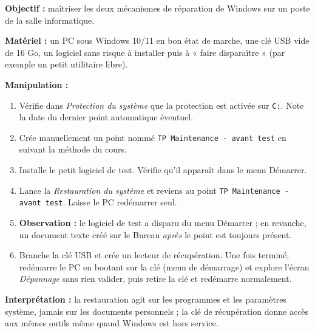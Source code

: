 \documentclass[11pt]{article}
\begin{document}
\begin{experience}
\textbf{Objectif :} maîtriser les deux mécanismes de réparation de Windows sur un poste de la salle informatique.\par
\textbf{Matériel :} un PC sous Windows 10/11 en bon état de marche, une clé USB vide de 16 Go, un logiciel sans risque à installer puis à « faire disparaître » (par exemple un petit utilitaire libre).\par
\textbf{Manipulation :}
\begin{enumerate}
\item Vérifie dans \emph{Protection du système} que la protection est activée sur \texttt{C:}. Note la date du dernier point automatique éventuel.
\item Crée manuellement un point nommé \texttt{TP Maintenance - avant test} en suivant la méthode du cours.
\item Installe le petit logiciel de test. Vérifie qu'il apparaît dans le menu Démarrer.
\item Lance la \emph{Restauration du système} et reviens au point \texttt{TP Maintenance - avant test}. Laisse le PC redémarrer seul.
\item \textbf{Observation :} le logiciel de test a disparu du menu Démarrer ; en revanche, un document texte créé sur le Bureau \emph{après} le point est toujours présent.
\item Branche la clé USB et crée un lecteur de récupération. Une fois terminé, redémarre le PC en bootant sur la clé (menu de démarrage) et explore l'écran \emph{Dépannage} sans rien valider, puis retire la clé et redémarre normalement.
\end{enumerate}
\textbf{Interprétation :} la restauration agit sur les programmes et les paramètres système, jamais sur les documents personnels ; la clé de récupération donne accès aux mêmes outils même quand Windows est hors service.
\end{experience}
\end{document}

